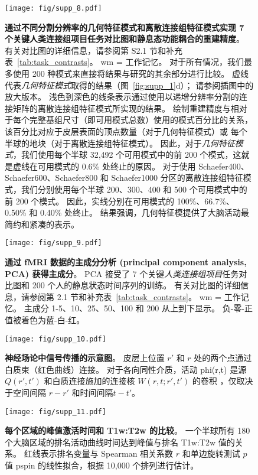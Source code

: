 \documentclass[lang=cn,a4paper,newtx,citestyle=gb7714-2015, bibstyle=gb7714-2015]{elegantpaper}
\begin{document}
\begin{figure}[!htb] 
	\centering
	\texttt{[image: fig/supp\_8.pdf]}
	\caption{
	\textbf{通过不同分割分辨率的几何特征模式和离散连接组特征模式实现 7 个关键人类连接组项目任务对比图和静息态功能耦合的重建精度}。
	有关对比图的详细信息，请参阅第 S2.1 节和补充表~\ref{tab:task_contrasts}。
	wm = 工作记忆。
	对于所有情况，我们最多使用 200 种模式来直接将结果与研究的其余部分进行比较。
	虚线代表\textit{几何特征模式}取得的结果（图~\ref{fig:supp_1}d）；
	请参阅插图中的放大版本。
	浅色到深色的线条表示通过使用以递增分辨率分割的连接矩阵的离散连接组特征模式所实现的结果。
	绘制重建精度与相对于每个完整基组尺寸（即可用模式总数）使用的模式百分比的关系，该百分比对应于皮层表面的顶点数量（对于几何特征模式）或 每个半球的地块（对于离散连接组特征模式）。
	因此，对于\textit{几何特征模式}，我们使用每个半球 32,492 个可用模式中的前 200 个模式，这就是虚线在可用模式的 0.6\% 处终止的原因。
	对于使用 Schaefer400、Schaefer600、Schaefer800 和 Schaefer1000 分区的离散连接组特征模式，我们分别使用每个半球 200、300、400 和 500 个可用模式中的前 200 个模式。
	因此，实线分别在可用模式的 100\%、66.7\%、0.50\% 和 0.40\% 处终止。
	结果强调，几何特征模提供了大脑活动最简约和紧凑的表示。
	} \label{fig:supp_8}
\end{figure}



\begin{figure}[!htb] 
	\centering
	\texttt{[image: fig/supp\_9.pdf]}
	\caption{
		\textbf{通过 fMRI 数据的主成分分析 (principal component analysis, PCA) 获得主成分}。
		PCA 接受了 7 个关键\textit{人类连接组项目}任务对比图和 200 个人的静息状态时间序列的训练。
		有关对比图的详细信息，请参阅第 2.1 节和补充表~\ref{tab:task_contrasts}。
		wm = 工作记忆。
		主成分 1-5、10、25、50、100 和 200 从上到下显示。
		负-零-正值被着色为蓝-白-红。
	} \label{fig:supp_9}
\end{figure}


\begin{figure}[!htb] 
	\centering
	\texttt{[image: fig/supp\_10.pdf]}
	\caption{\textbf{神经场论中信号传播的示意图}。
		皮层上位置 $ r' $ 和 $ r $ 处的两个点通过白质束（红色曲线）连接。 对于各向同性介质，活动 phi(r,t) 是源 $ Q(r',t') $ 和白质连接施加的连接核 $ W(r,t;r',t') $ 的卷积 ，仅取决于空间间隔 $ r-r' $ 和时间间隔$  t-t' $。
	} \label{fig:supp_10}
\end{figure}


\begin{figure}[!htb] 
	\centering
	\texttt{[image: fig/supp\_11.pdf]}
	\caption{
		\textbf{每个区域的峰值激活时间和 T1w:T2w 的比较}。
		一个半球所有 180 个大脑区域的排名活动曲线时间达到峰值与排名 T1w:T2w 值的关系。
		红线表示排名变量与 Spearman 相关系数 $ r $ 和单边旋转测试 $ p $ 值 pspin 的线性拟合，根据 10,000 个排列进行估计。
	} \label{fig:supp_11}
\end{figure}
\end{document}

